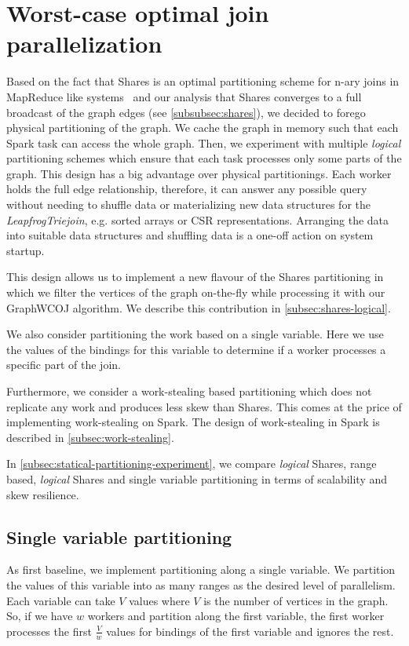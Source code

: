 \section{Worst-case optimal join parallelization}\label{sec:worst-case-optimal-join-parallelization}  %
Based on the fact that Shares is an optimal partitioning scheme for n-ary joins in MapReduce like systems~\cite{shares} and
our analysis that Shares converges to a full broadcast of the graph edges (see \cref{subsubsec:shares}), we decided
to forego physical partitioning of the graph.
We cache the graph in memory such that each Spark task can access the whole graph.
Then, we experiment with multiple \textit{logical} partitioning schemes which ensure that each task processes
only some parts of the graph.
This design has a big advantage over physical partitionings.
Each worker holds the full edge relationship, therefore, it can answer any possible query without needing to shuffle data or
materializing new data structures for the \textit{LeapfrogTriejoin}, e.g. sorted arrays or CSR representations.
Arranging the data into suitable data structures and shuffling data is a one-off action on system startup.

This design allows us to implement a new flavour of the Shares partitioning in which we filter the vertices of the
graph on-the-fly while processing it with our GraphWCOJ algorithm.
We describe this contribution in \cref{subsec:shares-logical}.

We also consider partitioning the work based on a single variable.
Here we use the values of the bindings for this variable to determine if a worker processes a specific part of the join.

Furthermore, we consider a work-stealing based partitioning which does not replicate any work and produces less
skew than Shares.
This comes at the price of implementing work-stealing on Spark.
The design of work-stealing in Spark is described in \cref{subsec:work-stealing}.

In \cref{subsec:statical-partitioning-experiment}, we compare \textit{logical} Shares, range based, \textit{logical} Shares
and single variable partitioning in terms of scalability and skew resilience.

\subsection{Single variable partitioning} \label{subsec:single-variable-partitioning}
As first baseline, we implement partitioning along a single variable.
We partition the values of this variable into as many ranges as the desired level of parallelism.
Each variable can take $V$ values where $V$ is the number of vertices in the graph.
So, if we have $w$ workers and partition along the first variable, the first worker processes the first $\frac{V}{w}$ values for
bindings of the first variable and ignores the rest.

